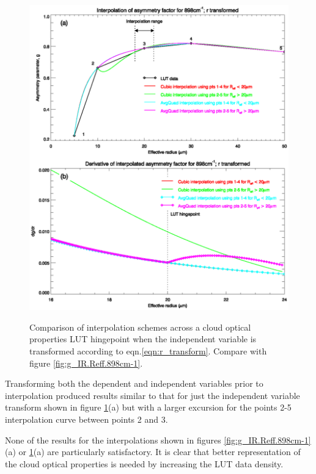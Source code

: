 \begin{figure}[htp]
  \centering
  \includegraphics[scale=0.8]{graphics/Cloud/g_IR.Reff.898cm-1.r_transformed.eps} \\
  \caption{Comparison of interpolation schemes across a cloud optical properties LUT hingepoint when the independent variable is transformed according to eqn.\ref{eqn:r_transform}. Compare with figure \ref{fig:g_IR.Reff.898cm-1}.}
  \label{fig:g_IR.Reff.898cm-1.r_transformed}
\end{figure}

Transforming both the dependent and independent variables prior to interpolation produced results similar to that for just the independent variable transform shown in figure \ref{fig:g_IR.Reff.898cm-1.r_transformed}(a) but with a larger excursion for the points 2-5 interpolation curve between points 2 and 3.

None of the results for the interpolations shown in figures \ref{fig:g_IR.Reff.898cm-1}(a) or \ref{fig:g_IR.Reff.898cm-1.r_transformed}(a) are particularly satisfactory. It is clear that better representation of the cloud optical properties is needed by increasing the LUT data density. 


